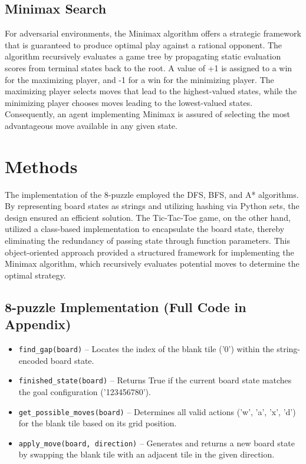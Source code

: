 \documentclass[journal]{./IEEE/IEEEtran}
\begin{document}
\subsection{Minimax Search}
For adversarial environments, the Minimax algorithm offers a strategic framework that is guaranteed to produce optimal play against a rational opponent. The algorithm recursively evaluates a game tree by propagating static evaluation scores from terminal states back to the root. A value of +1 is assigned to a win for the maximizing player, and -1 for a win for the minimizing player. The maximizing player selects moves that lead to the highest-valued states, while the minimizing player chooses moves leading to the lowest-valued states. Consequently, an agent implementing Minimax is assured of selecting the most advantageous move available in any given state.\cite{geeksforgeeks-Adversarial-Search-Algorithms-in-Artificial-Intelligence-(AI)}

\section{Methods}
The implementation of the 8-puzzle employed the DFS, BFS, and A* algorithms. By representing board states as strings and utilizing hashing via Python sets, the design ensured an efficient solution. The Tic-Tac-Toe game, on the other hand, utilized a class-based implementation to encapsulate the board state, thereby eliminating the redundancy of passing state through function parameters. This object-oriented approach provided a structured framework for implementing the Minimax algorithm, which recursively evaluates potential moves to determine the optimal strategy.

\subsection{8-puzzle Implementation (Full Code in Appendix)}
\begin{itemize}
  \item \texttt{find\_gap(board)} – Locates the index of the blank tile ('0') within the string-encoded board state.

  \item \texttt{finished\_state(board)} – Returns True if the current board state matches the goal configuration ('123456780').

  \item \texttt{get\_possible\_moves(board)} – Determines all valid actions ('w', 'a', 'x', 'd') for the blank tile based on its grid position.

  \item \texttt{apply\_move(board, direction)} – Generates and returns a new board state by swapping the blank tile with an adjacent tile in the given direction.
\end{itemize}
\end{document}
